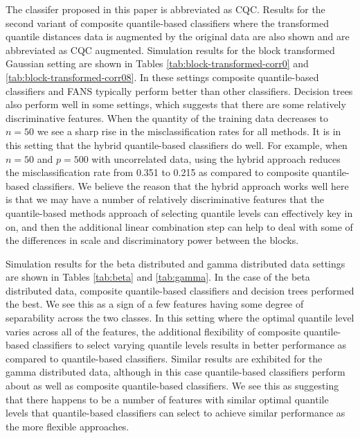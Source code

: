 The classifer proposed in this paper is abbreviated as CQC.  Results for the
second variant of composite quantile-based classifiers where the transformed
quantile distances data is augmented by the original data are also shown and are
abbreviated as CQC augmented.  Simulation results for the block transformed
Gaussian setting are shown in Tables \ref{tab:block-transformed-corr0} and
\ref{tab:block-transformed-corr08}.  In these settings composite quantile-based
classifiers and FANS typically perform better than other classifiers.  Decision
trees also perform well in some settings, which suggests that there are some
relatively discriminative features.  When the quantity of the training data
decreases to $n = 50$ we see a sharp rise in the misclassification rates for all
methods.  It is in this setting that the hybrid quantile-based classifiers do
well.  For example, when $n = 50$ and $p = 500$ with uncorrelated data, using
the hybrid approach reduces the misclassification rate from 0.351 to 0.215 as
compared to composite quantile-based classifiers.  We believe the reason that
the hybrid approach works well here is that we may have a number of relatively
discriminative features that the quantile-based methods approach of selecting
quantile levels can effectively key in on, and then the additional linear
combination step can help to deal with some of the differences in scale and
discriminatory power between the blocks.

Simulation results for the beta distributed and gamma distributed data settings
are shown in Tables \ref{tab:beta} and \ref{tab:gamma}.  In the case of the beta
distributed data, composite quantile-based classifiers and decision trees
performed the best.  We see this as a sign of a few features having some degree
of separability across the two classes.  In this setting where the optimal
quantile level varies across all of the features, the additional flexibility of
composite quantile-based classifiers to select varying quantile levels results
in better performance as compared to quantile-based classifiers.  Similar
results are exhibited for the gamma distributed data, although in this case
quantile-based classifiers perform about as well as composite quantile-based
classifiers.  We see this as suggesting that there happens to be a number of
features with similar optimal quantile levels that quantile-based classifiers
can select to achieve similar performance as the more flexible approaches.






